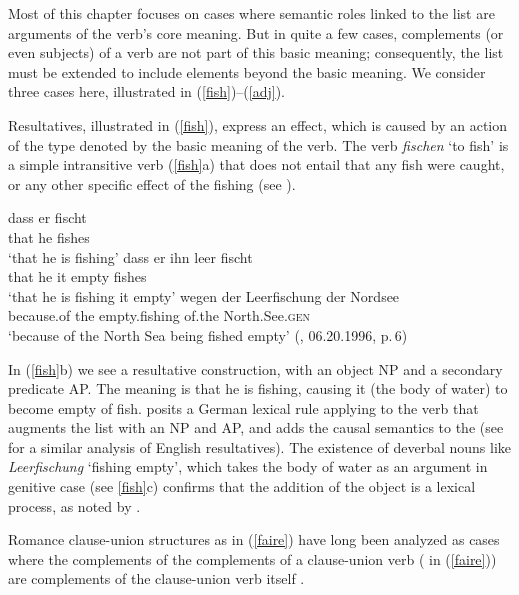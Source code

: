 \documentclass[output=paper
                ,modfonts
                ,nonflat
	        ,collection
	        ,collectionchapter
	        ,collectiontoclongg
 	        ,biblatex
                ,babelshorthands
                ,newtxmath
                ,draftmode
                ,colorlinks, citecolor=brown
]{./langsci/langscibook}
\begin{document}
Most of this chapter focuses on cases where semantic roles linked to the \argst list are arguments of the verb's core meaning. But in quite a few cases, complements (or even subjects) of a verb are not part of this basic meaning; consequently, the \argst list must be extended to include elements beyond the basic meaning. We consider three cases here, illustrated in (\ref{fish})--(\ref{adj}).  

Resultatives,  illustrated in (\ref{fish}), express an effect, which is caused by an action of the type denoted by the basic meaning of the verb. The verb \textit{fischen} `to fish' is a simple intransitive verb (\ref{fish}a) that does not entail that any fish were caught, or any other specific effect of the fishing (see \citealt[219--220]{Mueller2002b}).  

\begin{exe}
\ex\label{fish}
\begin{xlist}
\ex
\gll dass er  fischt\\
     that he  fishes\\
\glt `that he is fishing'
\ex 
\gll dass er ihn leer fischt\\
     that he it empty fishes\\
\glt `that he is fishing it empty'
\ex 
\gll wegen der Leerfischung der Nordsee \\
     because.of the empty.fishing of.the North.See.\textsc{gen} \\
\glt `because of the North Sea being fished empty' (, 06.20.1996, p.\,6)
\end{xlist}
\end{exe}

\noindent
 In (\ref{fish}b) we see a resultative construction, with an object NP and a secondary predicate AP.  The meaning is that he is fishing, causing it (the body of water) to become empty of fish.  \citet[241]{Mueller2002b} posits a German lexical rule applying to the verb that augments the \argst list with an NP and AP, and adds the causal semantics to the \content (see \citealt{Wechsler2005result} for a similar analysis of English resultatives).     The existence of deverbal nouns like \textit{Leerfischung} `fishing empty', which takes the body of water as an argument in genitive case (see \ref{fish}c) confirms that the addition of the object is a lexical process, as noted by \citet{Mueller2002b}.  

Romance clause-union structures as in (\ref{faire}) have long been analyzed as cases where the complements of the complements of a clause-union verb ( in (\ref{faire})) are complements of the clause-union verb itself \citep{Aissen1979}.
\end{document}
